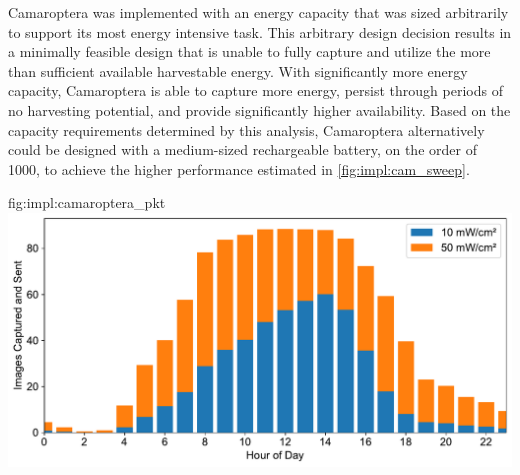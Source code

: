Camaroptera was implemented with an energy capacity that was sized arbitrarily to support its most energy intensive task. This arbitrary design decision results in a minimally feasible design that is unable to fully capture and utilize the more than sufficient available harvestable energy.
With significantly more energy capacity, Camaroptera is able to capture more energy, persist through periods of no harvesting potential, and provide significantly higher availability. 
Based on the capacity requirements determined by this analysis, Camaroptera alternatively could be designed with a medium-sized rechargeable battery, on the order of 1000\ssi{\Ah}, to achieve the higher performance estimated in \cref{fig:impl:cam_sweep}.


\begin{definefigure}{fig:impl:camaroptera_pkt}
    \centering
    \includegraphics[width=\linewidth]{figs/chap6/camaroptera_performance.pdf}
    \caption{
        The distribution of simulated Camaroptera transmitted image packets per hour in a day. 
        The distribution represents an average over the length of two synthesized outdoor traces (10 and 50\ssi[per-mode=symbol]{\milli\watt\per\centi\meter\squared}) based on the EnHANTs Setup D trace. 
        Camaroptera operation is limited to times when daylight is available, regardless of the scale of average input power. The average number of packets is significantly lower between 6PM and 6AM.
     }
\end{definefigure}

